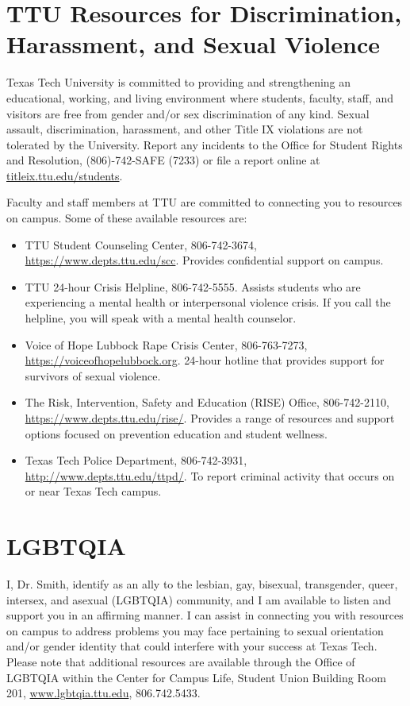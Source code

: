 \documentclass[12pt, notitlepage]{article}   	%
\begin{document}
{\section{TTU Resources for Discrimination, Harassment, and Sexual Violence}
Texas Tech University is committed to providing and strengthening an educational, 
working, and living environment where students, faculty, staff, and visitors are 
free from gender and/or sex discrimination of any kind. Sexual assault, discrimination, 
harassment, and other Title IX violations are not tolerated by the University. 
Report any incidents to the Office for Student Rights and Resolution, 
(806)-742-SAFE (7233) or file a report online at 
\url{titleix.ttu.edu/students}. 

Faculty and staff members at TTU are committed to connecting you to resources on campus. 
Some of these available resources are: 
\begin{itemize}
	\item{TTU Student Counseling Center, 806-742-3674, \url{https://www.depts.ttu.edu/scc}. 
		Provides confidential support on campus.} 
	\item{TTU 24-hour Crisis Helpline, 806-742-5555. 
		Assists students who are experiencing a mental health or interpersonal violence 
		crisis. If you call the helpline, you will speak with a mental health counselor.} 
	\item{Voice of Hope Lubbock Rape Crisis Center, 806-763-7273, 
		\url{https://voiceofhopelubbock.org}.
		24-hour hotline that provides support for survivors of sexual violence.} 
	\item{The Risk, Intervention, Safety and Education (RISE) Office, 806-742-2110, 
		\url{https://www.depts.ttu.edu/rise/}. Provides a range of resources and support 
		options focused on prevention education and student wellness.} 
	\item{Texas Tech Police Department, 806-742-3931, 
		\url{http://www.depts.ttu.edu/ttpd/}. 
		To report criminal activity that occurs on or near Texas Tech campus.}
\end{itemize}

\section{LGBTQIA}
I, Dr. Smith, identify as an ally to the lesbian, gay, bisexual, transgender, queer, intersex, 
and asexual (LGBTQIA) community, and I am available to listen and support you in an 
affirming manner. I can assist in connecting you with resources on campus to address 
problems you may face pertaining to sexual orientation and/or gender identity that could 
interfere with your success at Texas Tech. Please note that additional resources are 
available through the Office of LGBTQIA within the Center for Campus Life, 
Student Union Building Room 201, 
\url{www.lgbtqia.ttu.edu}, 806.742.5433.

}
\end{document}
